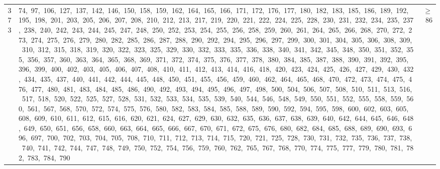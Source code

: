 \begin{longtable}{c|p{}|r}
373 & 74,\ 97,\ 106,\ 127,\ 137,\ 142,\ 146,\ 150,\ 158,\ 159,\ 162,\ 164,\ 165,\ 166,\ 171,\ 172,\ 176,\ 177,\ 180,\ 182,\ 183,\ 185,\ 186,\ 189,\ 192,\ 195,\ 198,\ 201,\ 203,\ 205,\ 206,\ 207,\ 208,\ 210,\ 212,\ 213,\ 217,\ 219,\ 220,\ 221,\ 222,\ 224,\ 225,\ 228,\ 230,\ 231,\ 232,\ 234,\ 235,\ 237,\ 238,\ 240,\ 242,\ 243,\ 244,\ 245,\ 247,\ 248,\ 250,\ 252,\ 253,\ 254,\ 255,\ 256,\ 258,\ 259,\ 260,\ 261,\ 264,\ 265,\ 266,\ 268,\ 270,\ 272,\ 273,\ 274,\ 275,\ 276,\ 279,\ 280,\ 282,\ 285,\ 286,\ 287,\ 288,\ 290,\ 292,\ 294,\ 295,\ 296,\ 297,\ 299,\ 300,\ 301,\ 304,\ 305,\ 306,\ 308,\ 309,\ 310,\ 312,\ 315,\ 318,\ 319,\ 320,\ 322,\ 323,\ 325,\ 329,\ 330,\ 332,\ 333,\ 335,\ 336,\ 338,\ 340,\ 341,\ 342,\ 345,\ 348,\ 350,\ 351,\ 352,\ 355,\ 356,\ 357,\ 360,\ 363,\ 364,\ 365,\ 368,\ 369,\ 371,\ 372,\ 374,\ 375,\ 376,\ 377,\ 378,\ 380,\ 384,\ 385,\ 387,\ 388,\ 390,\ 391,\ 392,\ 395,\ 396,\ 399,\ 400,\ 402,\ 403,\ 405,\ 406,\ 407,\ 408,\ 410,\ 411,\ 412,\ 413,\ 414,\ 416,\ 418,\ 420,\ 423,\ 424,\ 425,\ 426,\ 427,\ 429,\ 430,\ 432,\ 434,\ 435,\ 437,\ 440,\ 441,\ 442,\ 444,\ 445,\ 448,\ 450,\ 451,\ 455,\ 456,\ 459,\ 460,\ 462,\ 464,\ 465,\ 468,\ 470,\ 472,\ 473,\ 474,\ 475,\ 476,\ 477,\ 480,\ 481,\ 483,\ 484,\ 485,\ 486,\ 490,\ 492,\ 493,\ 494,\ 495,\ 496,\ 497,\ 498,\ 500,\ 504,\ 506,\ 507,\ 508,\ 510,\ 511,\ 513,\ 516,\ 517,\ 518,\ 520,\ 522,\ 525,\ 527,\ 528,\ 531,\ 532,\ 533,\ 534,\ 535,\ 539,\ 540,\ 544,\ 546,\ 548,\ 549,\ 550,\ 551,\ 552,\ 555,\ 558,\ 559,\ 560,\ 561,\ 567,\ 568,\ 570,\ 572,\ 574,\ 575,\ 576,\ 580,\ 582,\ 583,\ 584,\ 585,\ 588,\ 589,\ 590,\ 592,\ 594,\ 595,\ 598,\ 600,\ 602,\ 603,\ 605,\ 608,\ 609,\ 610,\ 611,\ 612,\ 615,\ 616,\ 620,\ 621,\ 624,\ 627,\ 629,\ 630,\ 632,\ 635,\ 636,\ 637,\ 638,\ 639,\ 640,\ 642,\ 644,\ 645,\ 646,\ 648,\ 649,\ 650,\ 651,\ 656,\ 658,\ 660,\ 663,\ 664,\ 665,\ 666,\ 667,\ 670,\ 671,\ 672,\ 675,\ 676,\ 680,\ 682,\ 684,\ 685,\ 688,\ 689,\ 690,\ 693,\ 696,\ 697,\ 700,\ 702,\ 703,\ 704,\ 705,\ 708,\ 710,\ 711,\ 712,\ 713,\ 714,\ 715,\ 720,\ 721,\ 725,\ 728,\ 730,\ 731,\ 732,\ 735,\ 736,\ 737,\ 738,\ 740,\ 741,\ 742,\ 744,\ 747,\ 748,\ 749,\ 750,\ 752,\ 754,\ 756,\ 759,\ 760,\ 762,\ 765,\ 767,\ 768,\ 770,\ 774,\ 775,\ 777,\ 779,\ 780,\ 781,\ 782,\ 783,\ 784,\ 790 & $\ge$ 86 \\

\end{longtable}
